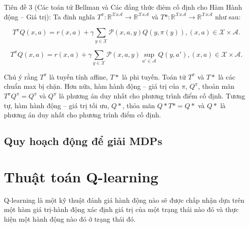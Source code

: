 \documentclass[14pt,a4paper,oneside]{report}		%
\begin{document}
Tiên đề 3 (Các toán tử Bellman và Các đẳng thức điẻm cố định cho Hàm Hành động – Giá trị): Ta đinh nghĩa $T^\pi: \mathbb{R}^{\mathcal{X}x\mathcal{A}}\rightarrow\mathbb{R}^{\mathcal{X}x\mathcal{A}}$ và $T*: \mathbb{R}^{\mathcal{X}x\mathcal{A}}\rightarrow\mathbb{R}^{\mathcal{X}x\mathcal{A}}$ như sau:

\begin{equation} \label{eq14}
T^\pi Q(x,a)= r(x,a) + \gamma \sum_{y\in\mathcal{X}}\mathcal{P}(x,a,y)Q(y,\pi(y)), (x,a)\in\mathcal{X}\times\mathcal{A}.
\end{equation}

\begin{equation} \label{eq15}
T^\pi Q(x,a)= r(x,a) + \gamma \displaystyle\sum_{y\in\mathcal{X}}\mathcal{P}(x,a,y)\sup_{a'\in\mathcal{A}}Q(y,a'), (x,a)\in\mathcal{X}\times\mathcal{A}.
\end{equation}

Chú ý rằng $T^\pi$ là tuyến tính affine, $T*$ là phi tuyến. Toán tử $T^\pi$ và $T*$ là các chuẩn max bị chặn. Hơn nữa, hàm hành động – giá trị của $\pi$, $Q^\pi$, thoản mãn $T^\pi Q^\pi=Q^\pi$ và $Q^\pi$ là phương án duy nhất cho phương trình điểm cố định. Tương tự, hàm hành động – giá trị tối ưu, $Q*$, thỏa mãn $Q*T*=Q*$ và $Q*$ là phương án duy nhất cho phương trình điểm cố định.

\subsection{Quy hoạch động để giải MDPs}

\section{Thuật toán Q-learning}
Q-learning là một kỹ thuật đánh giá hành động nào sẽ được chấp nhận dựa trên một hàm giá trị-hành động xác định giá trị của một trạng thái nào đó và thực hiện một hành động nào đó ở trạng thái đó. 
\end{document}
